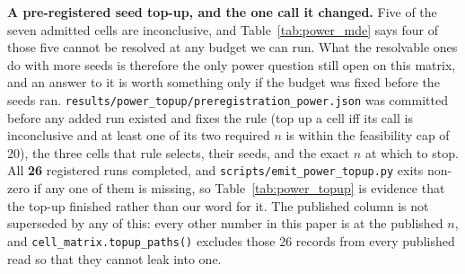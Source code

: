 \textbf{A pre-registered seed top-up, and the one call it changed.}  Five of the
seven admitted cells are inconclusive, and Table~\ref{tab:power_mde} says four of
those five cannot be resolved at any budget we can run.  What the resolvable ones do
with more seeds is therefore the only power question still open on this matrix, and
an answer to it is worth something only if the budget was fixed before the seeds
ran.  \texttt{results/power\_topup/preregistration\_power.json} was committed before
any added run existed and fixes the rule (top up a cell iff its call is inconclusive
and at least one of its two required $n$ is within the feasibility cap of 20), the
three cells that rule selects, their seeds, and the exact $n$ at which to stop.  All
\textbf{26} registered runs completed, and \texttt{scripts/emit\_power\_topup.py}
exits non-zero if any one of them is missing, so Table~\ref{tab:power_topup} is
evidence that the top-up finished rather than our word for it.  The published column
is not superseded by any of this: every other number in this paper is at the
published $n$, and \texttt{cell\_matrix.topup\_paths()} excludes those 26 records
from every published read so that they cannot leak into one.




